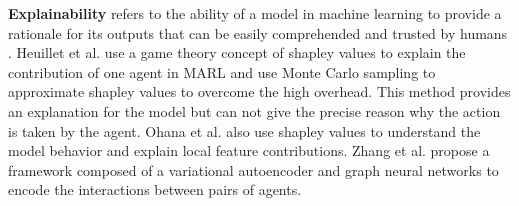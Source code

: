 \documentclass[acmsmall]{acmart}
\begin{document}
\textbf{Explainability} refers to the ability of a model in machine learning to provide a rationale for its outputs that can be easily comprehended and trusted by humans \cite{10.1007/978-3-030-57321-8_5,10.1145/3527448}.
Heuillet et al. \cite{9679742} use a game theory concept of shapley values to explain the contribution of one agent in MARL and use Monte Carlo sampling to approximate shapley values to overcome the high overhead. This method provides an explanation for the model but can not give the precise reason why the action is taken by the agent.
Ohana et al. \cite{10.1007/978-3-030-82017-6_12} also use shapley values
to understand the model behavior and explain local feature contributions.
Zhang et al. \cite{ZHANG2021383} propose a framework composed of a variational autoencoder and graph neural networks to encode the interactions between pairs of agents.
\end{document}
